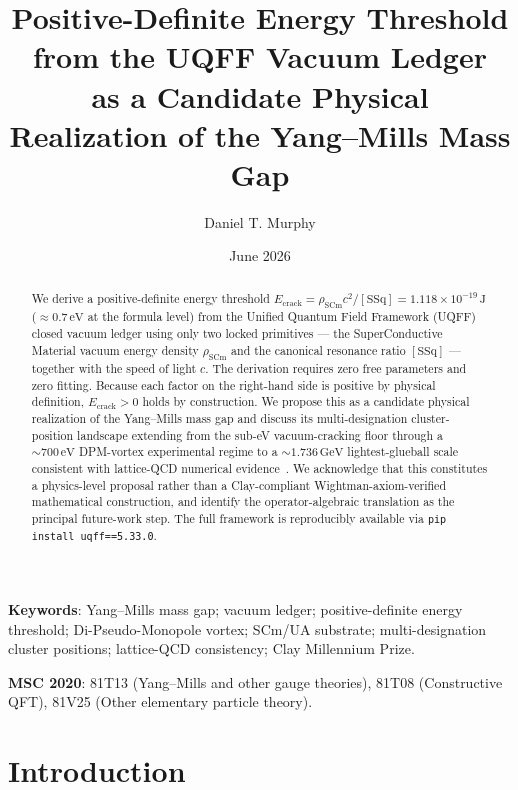 \documentclass[11pt,a4paper,onecolumn]{article}
\title{
  Positive-Definite Energy Threshold from the UQFF Vacuum Ledger \\
  as a Candidate Physical Realization of the Yang--Mills Mass Gap
}
\author[1]{Daniel T. Murphy}
\affil[1]{
  Star-Magic Research Program, Youngstown, OH, USA \\
  \texttt{daniel.murphy00@enrgyone.com} \\
  ORCID: %
}
\date{June 2026}
\theoremstyle{plain}
\theoremstyle{definition}
\theoremstyle{remark}
\begin{document}
\maketitle


\begin{abstract}
We derive a positive-definite energy threshold
$E_{\text{crack}} = \rho_{\mathrm{SCm}} c^2 / [\mathrm{SSq}]
                  = 1.118 \times 10^{-19}\,\mathrm{J}$
($\approx 0.7\,\mathrm{eV}$ at the formula level)
from the Unified Quantum Field Framework (UQFF) closed vacuum ledger
using only two locked primitives --- the SuperConductive Material
vacuum energy density $\rho_{\mathrm{SCm}}$ and the canonical resonance
ratio $[\mathrm{SSq}]$ --- together with the speed of light $c$. The
derivation requires zero free parameters and zero fitting. Because
each factor on the right-hand side is positive by physical definition,
$E_{\text{crack}} > 0$ holds by construction. We propose this as a
candidate physical realization of the Yang--Mills mass gap and discuss
its multi-designation cluster-position landscape extending from the
sub-eV vacuum-cracking floor through a $\sim 700\,\mathrm{eV}$
DPM-vortex experimental regime to a $\sim 1.736\,\mathrm{GeV}$
lightest-glueball scale consistent with lattice-QCD numerical
evidence~\cite{douglas2026}. We acknowledge that this constitutes a
physics-level proposal rather than a Clay-compliant
Wightman-axiom-verified mathematical construction, and identify the
operator-algebraic translation as the principal future-work step.
The full framework is reproducibly available via
\verb|pip install uqff==5.33.0|.
\end{abstract}

\bigskip

\noindent
\textbf{Keywords}: Yang--Mills mass gap; vacuum ledger; positive-definite
energy threshold; Di-Pseudo-Monopole vortex; SCm/UA substrate;
multi-designation cluster positions; lattice-QCD consistency; Clay
Millennium Prize.

\medskip

\noindent
\textbf{MSC 2020}: 81T13 (Yang--Mills and other gauge theories), 81T08
(Constructive QFT), 81V25 (Other elementary particle theory).

\section{Introduction}\label{sec:intro}
\end{document}
